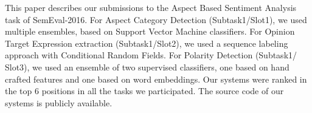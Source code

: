 This paper describes our submissions to the Aspect Based Sentiment Analysis task of SemEval-2016. For Aspect Category Detection (Subtask1/Slot1), we used multiple ensembles, based on Support Vector Machine classifiers. For Opinion Target Expression extraction (Subtask1/Slot2), we used a sequence labeling approach with Conditional Random Fields. For Polarity Detection (Subtask1/ Slot3), we used an ensemble of two supervised classifiers, one based on hand crafted features and one based on word embeddings. Our systems were ranked in the top 6 positions in all the tasks we participated. The source code of our systems is publicly available.
